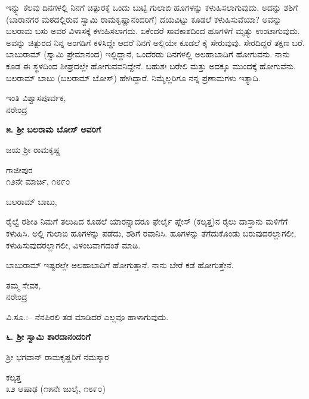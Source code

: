 ಇನ್ನ್ನು ಕೆಲವು ದಿನಗಳಲ್ಲಿ ನಿನಗೆ ಚಿತ್ಪುರಕ್ಕೆ ಒಂದು ಬುಟ್ಟಿ ಗುಲಾಬಿ ಹೂಗಳನ್ನು ಕಳುಹಿಸಲಾಗುವುದು. ಅದನ್ನು ಶಶಿಗೆ (ಬಾರಾನಗರ ಮಠದಲ್ಲಿರುವ ಸ್ವಾಮಿ ರಾಮಕೃಷ್ಣಾನಂದರಿಗೆ) ದಯವಿಟ್ಟು ಕೂಡಲೆ ಕಳುಹಿಸುವೆಯಾ? ಅವನ್ನು ಬಲರಾಮ ಬಸು ಅವರ ವಿಳಾಸಕ್ಕೆ ಕಳುಹಿಸಲಾಗದು. ಏಕೆಂದರೆ ಸಾವಕಾಶದಿಂದ ಹೂಗಳಿಗೆ ಮೃತ್ಯು ಉಂಟಾಗುವುದು. ಅವನ್ನು ಚಿತ್ಪುರದ ನಿನ್ನ ಅಂಗಡಿಗೆ ಕಳಿಸಿದ್ದೇ ಆದರೆ ನಿನಗೆ ಅಲ್ಲಿಯೇ ಕೂಡಲೆ ಕೈ ಸೇರುವುವು. ಸೇರದಿದ್ದರೆ ತಕ್ಷಣ ಬರೆ. ಬಾಬುರಾಮ್​ (ಸ್ವಾಮಿ ಪ್ರೇಮಾನಂದ) ಇಲ್ಲಿದ್ದಾನೆ, ಒಂದೆರಡು ದಿನಗಳಲ್ಲಿ ಅಲಹಾಬಾದಿಗೆ ಹೋಗುವನು. ನಾನು ಕೂಡ ಈ ಸ್ಥಳದಿಂದ ಶೀಘ್ರದಲ್ಲೇ ಹೋಗುವವನಿದ್ದೇನೆ. ಬಹುಶಃ ಬರೇಲಿ ಮತ್ತು ಅದಕ್ಕೂ ಮುಂದಕ್ಕೆ ಹೋಗುವೆನು. ಬಲರಾಮ್​ ಬಾಬು (ಬಲರಾಮ್​ ಬೋಸ್) ಹೇಗಿದ್ದಾರೆ. ನಿಮ್ಮೆಲ್ಲರಿಗೂ ನನ್ನ ಪ್ರಣಾಮಗಳು ಇತ್ಯಾದಿ.

\begin{flushright}
ಇಂತಿ ವಿಶ್ವಾಸಪೂರ್ವಕ,\\ನರೇಂದ್ರ
\end{flushright}

\begin{center}
\textbf{೫. ಶ‍್ರೀ ಬಲರಾಮ ಬೋಸ್ ಅವರಿಗೆ}
\end{center}

\begin{center}
ಜಯ ಶ‍್ರೀ ರಾಮಕೃಷ್ಣ
\end{center}

\begin{flushright}
ಗಾಜೀಪುರ\\೧೨ನೇ ಮಾರ್ಚಿ, ೧೮೯೦
\end{flushright}

ಬಲರಾಮ್​ ಬಾಬು,

ರೈಲ್ವೆ ರಶೀತಿ ನಿಮಗೆ ತಲುಪಿದ ಕೂಡಲೆ ಯಾರನ್ನಾದರೂ ಫೇರ್ಲೈ ಪ್ಲೇಸ್ (ಕಲ್ಕತ್ತ)ನ ರೈಲು ದಾಸ್ತಾನು ಮಳಿಗೆಗೆ ಕಳುಹಿಸಿ. ಅಲ್ಲಿ ಗುಲಾಬಿ ಹೂಗಳನ್ನು ಪಡೆದು, ಶಶಿಗೆ ರವಾನಿಸಿ. ಹೂಗಳನ್ನು ತೆಗೆದುಕೊಂಡು ಬರುವುದರಲ್ಲಾಗಲೀ, ಕಳುಹಿಸುವುದರಲ್ಲಾಗಲೀ, ವಿಳಂಬವಾಗದಂತೆ ಮಾಡಿ.

ಬಾಬುರಾಮ್​ ಇಷ್ಟರಲ್ಲೇ ಅಲಹಾಬಾದಿಗೆ ಹೋಗುತ್ತಾನೆ. ನಾನು ಬೇರೆ ಕಡೆ ಹೋಗುತ್ತೇನೆ.

\begin{flushright}
ತಮ್ಮ ಸೇವಕ,\\ನರೇಂದ್ರ
\end{flushright}

{\small ವಿ.ಸೂ.:– ನೆನಪಿರಲಿ ತಡ ಮಾಡಿದರೆ ಎಲ್ಲವೂ ಹಾಳಾಗುವುದು.}

\begin{center}
\textbf{೬. ಶ‍್ರೀ ಸ್ವಾಮಿ ಶಾರದಾನಂದರಿಗೆ}
\end{center}

\begin{center}
ಶ‍್ರೀ ಭಗವಾನ್ ರಾಮಕೃಷ್ಣರಿಗೆ ನಮಸ್ಕಾರ
\end{center}

\begin{flushright}
ಕಲ್ಕತ್ತ\\೩೨ ಆಷಾಢ (೧೫ನೇ ಜುಲೈ, ೧೮೯೦)
\end{flushright}

